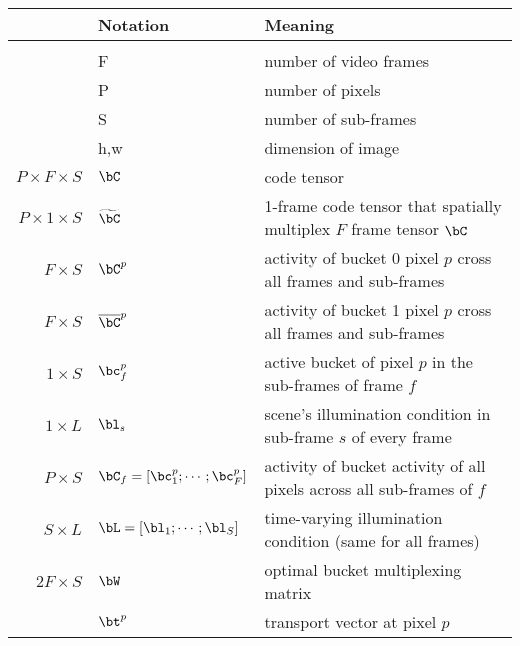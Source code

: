 \documentclass[11pt]{article}
\begin{document}
\begin{table}[!htbp]
    \begin{center}
    \begin{tabular}{rll}
        \multicolumn{1}{r}{\bf} & \multicolumn{1}{l}{\bf Notation}   &\multicolumn{1}{l}{\bf Meaning}\\
        \hline \\
                             & F                                       & number of video frames \\
                             & P                                       & number of pixels \\
                             & S                                       & number of sub-frames \\
                             & h,w                                     & dimension of image \\
        $P\times F\times S$  & $\bC$                                   & code tensor \\
        $P\times 1\times S$  & $\widetilde{\bC}$                       & 1-frame code tensor that spatially multiplex $F$ frame tensor $\bC$ \\
        $F\times S$          & $\bC^p$                                 & activity of bucket 0 pixel $p$ cross all frames and sub-frames \\
        $F\times S$          & $\overline{\bC}^p$                       & activity of bucket 1 pixel $p$ cross all frames and sub-frames \\
        $1\times S$          & $\bc^p_f$                               & active bucket of pixel $p$ in the sub-frames of frame $f$ \\
        $1\times L$          & $\bl_s$                                 & scene's illumination condition in sub-frame $s$ of every frame \\
        $P\times S$          & $\bC_f=[\bc_1^p;\cdots;\bc_F^p]$        & activity of bucket activity of all pixels across all sub-frames of $f$ \\
        $S\times L$          & $\bL= [\bl_1;\cdots;\bl_S]$             & time-varying illumination condition (same for all frames) \\
        $2F\times S$         & $\bW$                                   & optimal bucket multiplexing matrix \\
                             & $\bt^p$                                 & transport vector at pixel $p$ \\

\end{tabular}
\end{center}
\end{table}
\end{document}
